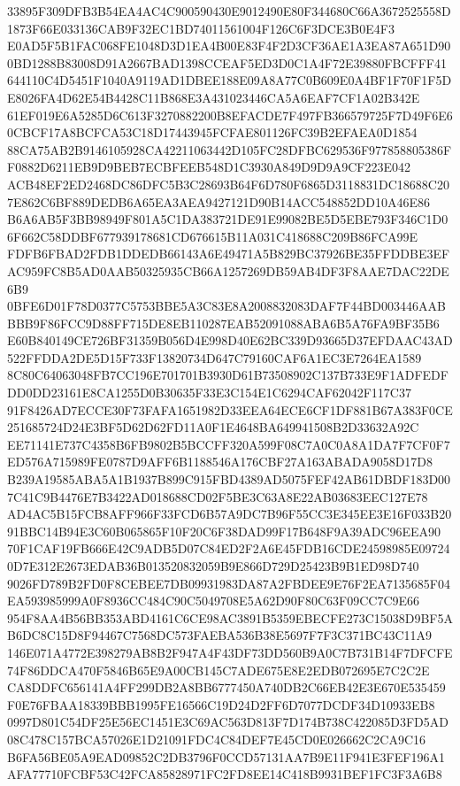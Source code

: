 \documentclass[UTF8,fontset=fandol,zihao=-4,a4paper]{ctexart}
\begin{document}
{{33895F309DFB3B54EA4AC4C900590430E9012490E80F344680C66A3672525558D1873F66E033136CAB9F32EC1BD74011561004F126C6F3DCE3B0E4F3
E0AD5F5B1FAC068FE1048D3D1EA4B00E83F4F2D3CF36AE1A3EA87A651D900BD1288B83008D91A2667BAD1398CCEAF5ED3D0C1A4F72E39880FBCFFF41
644110C4D5451F1040A9119AD1DBEE188E09A8A77C0B609E0A4BF1F70F1F5DE8026FA4D62E54B4428C11B868E3A431023446CA5A6EAF7CF1A02B342E
61EF019E6A5285D6C613F3270882200B8EFACDE7F497FB366579725F7D49F6E60CBCF17A8BCFCA53C18D17443945FCFAE801126FC39B2EFAEA0D1854
88CA75AB2B9146105928CA42211063442D105FC28DFBC629536F977858805386FF0882D6211EB9D9BEB7ECBFEEB548D1C3930A849D9D9A9CF223E042
ACB48EF2ED2468DC86DFC5B3C28693B64F6D780F6865D3118831DC18688C207E862C6BF889DEDB6A65EA3AEA9427121D90B14ACC548852DD10A46E86
B6A6AB5F3BB98949F801A5C1DA383721DE91E99082BE5D5EBE793F346C1D06F662C58DDBF677939178681CD676615B11A031C418688C209B86FCA99E
FDFB6FBAD2FDB1DDEDB66143A6E49471A5B829BC37926BE35FFDDBE3EFAC959FC8B5AD0AAB50325935CB66A1257269DB59AB4DF3F8AAE7DAC22DE6B9
0BFE6D01F78D0377C5753BBE5A3C83E8A2008832083DAF7F44BD003446AABBBB9F86FCC9D88FF715DE8EB110287EAB52091088ABA6B5A76FA9BF35B6
E60B840149CE726BF31359B056D4E998D40E62BC339D93665D37EFDAAC43AD522FFDDA2DE5D15F733F13820734D647C79160CAF6A1EC3E7264EA1589
8C80C64063048FB7CC196E701701B3930D61B73508902C137B733E9F1ADFEDFDD0DD23161E8CA1255D0B30635F33E3C154E1C6294CAF62042F117C37
91F8426AD7ECCE30F73FAFA1651982D33EEA64ECE6CF1DF881B67A383F0CE251685724D24E3BF5D62D62FD11A0F1E4648BA649941508B2D33632A92C
EE71141E737C4358B6FB9802B5BCCFF320A599F08C7A0C0A8A1DA7F7CF0F7ED576A715989FE0787D9AFF6B1188546A176CBF27A163ABADA9058D17D8
B239A19585ABA5A1B1937B899C915FBD4389AD5075FEF42AB61DBDF183D007C41C9B4476E7B3422AD018688CD02F5BE3C63A8E22AB03683EEC127E78
AD4AC5B15FCB8AFF966F33FCD6B57A9DC7B96F55CC3E345EE3E16F033B2091BBC14B94E3C60B065865F10F20C6F38DAD99F17B648F9A39ADC96EEA90
70F1CAF19FB666E42C9ADB5D07C84ED2F2A6E45FDB16CDE24598985E097240D7E312E2673EDAB36B013520832059B9E866D729D25423B9B1ED98D740
9026FD789B2FD0F8CEBEE7DB09931983DA87A2FBDEE9E76F2EA7135685F04EA593985999A0F8936CC484C90C5049708E5A62D90F80C63F09CC7C9E66
954F8AA4B56BB353ABD4161C6CE98AC3891B5359EBECFE273C15038D9BF5AB6DC8C15D8F94467C7568DC573FAEBA536B38E5697F7F3C371BC43C11A9
146E071A4772E398279AB8B2F947A4F43DF73DD560B9A0C7B731B14F7DFCFE74F86DDCA470F5846B65E9A00CB145C7ADE675E8E2EDB072695E7C2C2E
CA8DDFC656141A4FF299DB2A8BB6777450A740DB2C66EB42E3E670E535459F0E76FBAA18339BBB1995FE16566C19D24D2FF6D7077DCDF34D10933EB8
0997D801C54DF25E56EC1451E3C69AC563D813F7D174B738C422085D3FD5AD08C478C157BCA57026E1D21091FDC4C84DEF7E45CD0E026662C2CA9C16
B6FA56BE05A9EAD09852C2DB3796F0CCD57131AA7B9E11F941E3FEF196A1AFA77710FCBF53C42FCA85828971FC2FD8EE14C418B9931BEF1FC3F3A6B8
}}
\end{document}
